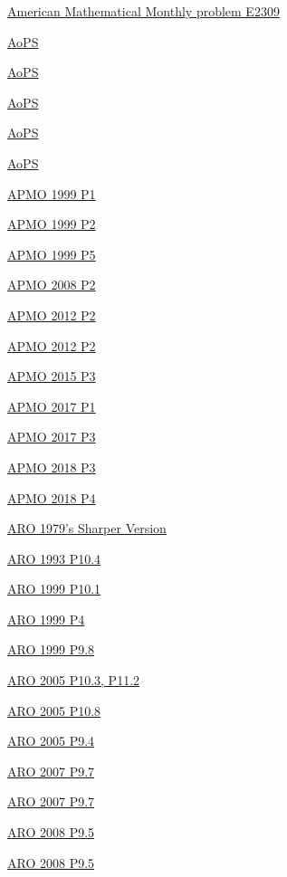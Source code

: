 \hyperref  [problem:American Mathematical Monthly problem E2309]{American Mathematical Monthly problem E2309}

\hyperref  [problem:AoPS]{AoPS}

\hyperref  [problem:AoPS]{AoPS}

\hyperref  [problem:AoPS]{AoPS}

\hyperref  [problem:AoPS]{AoPS}

\hyperref  [problem:AoPS]{AoPS}

\hyperref  [problem:APMO 1999 P1]{APMO 1999 P1}

\hyperref  [problem:APMO 1999 P2]{APMO 1999 P2}

\hyperref  [problem:APMO 1999 P5]{APMO 1999 P5}

\hyperref  [problem:APMO 2008 P2]{APMO 2008 P2}

\hyperref  [problem:APMO 2012 P2]{APMO 2012 P2}

\hyperref  [problem:APMO 2012 P2]{APMO 2012 P2}

\hyperref  [problem:APMO 2015 P3]{APMO 2015 P3}

\hyperref  [problem:APMO 2017 P1]{APMO 2017 P1}

\hyperref  [problem:APMO 2017 P3]{APMO 2017 P3}

\hyperref  [problem:APMO 2018 P3]{APMO 2018 P3}

\hyperref  [problem:APMO 2018 P4]{APMO 2018 P4}

\hyperref  [problem:ARO 1979's Sharper Version]{ARO 1979's Sharper Version}

\hyperref  [problem:ARO 1993 P10.4]{ARO 1993 P10.4}

\hyperref  [problem:ARO 1999 P10.1]{ARO 1999 P10.1}

\hyperref  [problem:ARO 1999 P4]{ARO 1999 P4}

\hyperref  [problem:ARO 1999 P9.8]{ARO 1999 P9.8}

\hyperref  [problem:ARO 2005 P10.3, P11.2]{ARO 2005 P10.3, P11.2}

\hyperref  [problem:ARO 2005 P10.8]{ARO 2005 P10.8}

\hyperref  [problem:ARO 2005 P9.4]{ARO 2005 P9.4}

\hyperref  [problem:ARO 2007 P9.7]{ARO 2007 P9.7}

\hyperref  [problem:ARO 2007 P9.7]{ARO 2007 P9.7}

\hyperref  [problem:ARO 2008 P9.5]{ARO 2008 P9.5}

\hyperref  [problem:ARO 2008 P9.5]{ARO 2008 P9.5}

